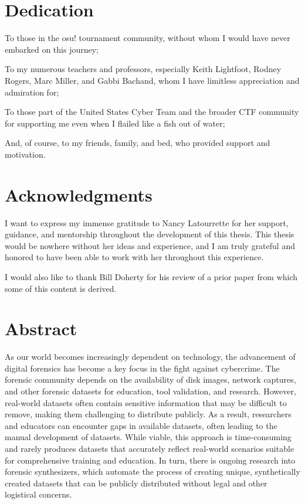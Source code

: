 \section{Dedication}\label{dedication}

To those in the osu! tournament community, without whom I would have
never embarked on this journey;

To my numerous teachers and professors, especially Keith Lightfoot,
Rodney Rogers, Marc Miller, and Gabbi Bachand, whom I have limitless
appreciation and admiration for;

To those part of the United States Cyber Team and the broader CTF
community for supporting me even when I flailed like a fish out of
water;

And, of course, to my friends, family, and bed, who provided support and
motivation.

\section{Acknowledgments}\label{acknowledgments}

I want to express my immense gratitude to Nancy Latourrette for her
support, guidance, and mentorship throughout the development of this
thesis. This thesis would be nowhere without her ideas and experience,
and I am truly grateful and honored to have been able to work with her
throughout this experience.

I would also like to thank Bill Doherty for his review of a prior paper
from which some of this content is derived.

\section{Abstract}\label{abstract}

As our world becomes increasingly dependent on technology, the
advancement of digital forensics has become a key focus in the fight
against cybercrime. The forensic community depends on the availability
of disk images, network captures, and other forensic datasets for
education, tool validation, and research. However, real-world datasets
often contain sensitive information that may be difficult to remove,
making them challenging to distribute publicly. As a result, researchers
and educators can encounter gaps in available datasets, often leading to
the manual development of datasets. While viable, this approach is
time-consuming and rarely produces datasets that accurately reflect
real-world scenarios suitable for comprehensive training and education.
In turn, there is ongoing research into forensic synthesizers, which
automate the process of creating unique, synthetically created datasets
that can be publicly distributed without legal and other logistical
concerns.

